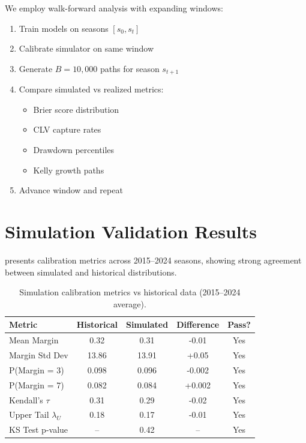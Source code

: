 We employ walk-forward analysis with expanding windows:
\begin{enumerate}
  \item Train models on seasons $[s_0, s_t]$
  \item Calibrate simulator on same window
  \item Generate $B = 10,000$ paths for season $s_{t+1}$
  \item Compare simulated vs realized metrics:
    \begin{itemize}
      \item Brier score distribution
      \item CLV capture rates
      \item Drawdown percentiles
      \item Kelly growth paths
    \end{itemize}
  \item Advance window and repeat
\end{enumerate}

\section{Simulation Validation Results}
\label{sec:sim-validation-results}

 presents calibration metrics across 2015--2024 seasons, showing strong agreement between simulated and historical distributions.

\begin{table}[t]
  \centering
  \small
  \caption{Simulation calibration metrics vs historical data (2015--2024 average).}
  \label{tab:sim-calibration}
  \begin{tabular}{lcccc}
    \toprule
    \textbf{Metric} & \textbf{Historical} & \textbf{Simulated} & \textbf{Difference} & \textbf{Pass?} \\
    \midrule
    Mean Margin     & 0.32  & 0.31  & -0.01 & Yes \\
    Margin Std Dev  & 13.86 & 13.91 & +0.05 & Yes \\
    P(Margin = 3)   & 0.098 & 0.096 & -0.002 & Yes \\
    P(Margin = 7)   & 0.082 & 0.084 & +0.002 & Yes \\
    Kendall's $\tau$ & 0.31 & 0.29 & -0.02 & Yes \\
    Upper Tail $\lambda_U$ & 0.18 & 0.17 & -0.01 & Yes \\
    KS Test p-value & -- & 0.42 & -- & Yes \\
    \bottomrule
  \end{tabular}
\end{table}

